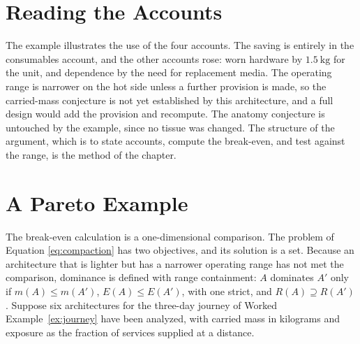 \documentclass[11pt,openany]{book}
\theoremstyle{definition}
\theoremstyle{remark}
\begin{document}
\section{Reading the Accounts}

The example illustrates the use of the four accounts. The saving is entirely in the consumables account, and the other accounts rose: worn hardware by $1.5\ \mathrm{kg}$ for the unit, and dependence by the need for replacement media. The operating range is narrower on the hot side unless a further provision is made, so the carried-mass conjecture is not yet established by this architecture, and a full design would add the provision and recompute. The anatomy conjecture is untouched by the example, since no tissue was changed. The structure of the argument, which is to state accounts, compute the break-even, and test against the range, is the method of the chapter.

\section{A Pareto Example}

The break-even calculation is a one-dimensional comparison. The problem of Equation \eqref{eq:compaction} has two objectives, and its solution is a set. Because an architecture that is lighter but has a narrower operating range has not met the comparison, dominance is defined with range containment: $A$ dominates $A'$ only if $m(A)\le m(A')$, $E(A)\le E(A')$, with one strict, and $R(A)\supseteq R(A')$. Suppose six architectures for the three-day journey of Worked Example~\ref{ex:journey} have been analyzed, with carried mass in kilograms and exposure as the fraction of services supplied at a distance.
\end{document}
